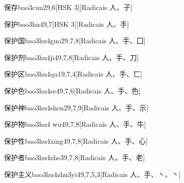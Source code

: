 \begin{entry}{保存}{bao3cun2}{9,6}[HSK 3][Radicais ⼈、⼦]
\end{entry}

\begin{entry}{保护}{bao3hu4}{9,7}[HSK 3][Radicais ⼈、⼿]
\end{entry}

\begin{entry}{保护国}{bao3hu4guo2}{9,7,8}[Radicais ⼈、⼿、⼞]
\end{entry}

\begin{entry}{保护剂}{bao3hu4ji4}{9,7,8}[Radicais ⼈、⼿、⼑]
\end{entry}

\begin{entry}{保护区}{bao3hu4qu1}{9,7,4}[Radicais ⼈、⼿、⼖]
\end{entry}

\begin{entry}{保护色}{bao3hu4se4}{9,7,6}[Radicais ⼈、⼿、⾊]
\end{entry}

\begin{entry}{保护神}{bao3hu4shen2}{9,7,9}[Radicais ⼈、⼿、⽰]
\end{entry}

\begin{entry}{保护物}{bao3hu4 wu4}{9,7,8}[Radicais ⼈、⼿、⽜]
\end{entry}

\begin{entry}{保护性}{bao3hu4xing4}{9,7,8}[Radicais ⼈、⼿、⼼]
\end{entry}

\begin{entry}{保护者}{bao3hu4zhe3}{9,7,8}[Radicais ⼈、⼿、⽼]
\end{entry}

\begin{entry}{保护主义}{bao3hu4zhu3yi4}{9,7,5,3}[Radicais ⼈、⼿、⼂、⼂]
\end{entry}


